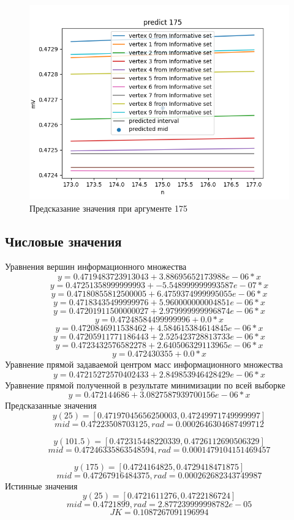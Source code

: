 \documentclass[a4paper,12pt]{article}
\begin{document}
\begin{figure}[H]
    \centering
    \includegraphics[width=12cm]{pics/predict175.png}
    \caption{Предсказание значения при аргументе 175}
    \label{fig:predict1000}
\end{figure}

\subsection{Числовые значения}
Уравнения вершин информационного множества
$$y = 0.4719483723913043 + 3.88695652173988e-06 * x$$
$$y = 0.47251358999999993 + -5.548999999993587e-07 * x$$
$$y = 0.47180855812500005 + 6.4759374999995055e-06 * x$$
$$y = 0.47183435499999976 + 5.960000000004851e-06 * x$$
$$y = 0.47201911500000027 + 2.979999999996874e-06 * x$$
$$y = 0.47248584499999996 + 0.0 * x$$
$$y = 0.4720846911538462 + 4.584615384614845e-06 * x$$
$$y = 0.47205911771186443 + 2.525423728813733e-06 * x$$
$$y = 0.4723432576582278 + 2.640506329113965e-06 * x$$
$$y = 0.472430355 + 0.0 * x$$
Уравнение прямой задаваемой центром масс информационного множества
$$y = 0.47215272570402433 + 2.849853946428429e-06 * x$$
Уравнение прямой полученной в результате минимизации по всей выборке
$$y = 0.472144686 + 3.0827587939700156e-06 * x$$
Предсказанные значения
$$y(25) = [0.47197045656250003, 0.47249971749999997]$$
$$mid = 0.47223508703125, rad = 0.0002646304687499712$$


$$y(101.5) = [0.472315448220339, 0.4726112690506329]$$
$$mid = 0.47246335863548594, rad = 0.0001479104151469457$$


$$y(175) = [0.4724164825, 0.4729418471875]$$
$$mid = 0.47267916484375, rad = 0.000262682343749987$$
Истинные значения
$$y(25) = [0.4721611276, 0.4722186724]$$
$$mid = 0.4721899, rad = 2.877239999998782e-05$$
$$JK = 0.1087267091196994$$
\end{document}
